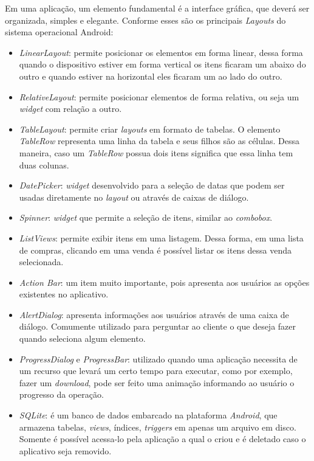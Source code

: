 	\par Em uma aplicação, um elemento fundamental é a interface gráfica, que
deverá ser organizada, simples e elegante. Conforme 
esses são os principais \textit{Layouts} do sistema operacional Android:
	\begin{itemize}
	
	 \item \textit{LinearLayout}: permite posicionar os elementos em forma
	 linear, dessa forma quando o dispositivo estiver em forma vertical os itens
	 ficaram um abaixo do outro e quando estiver na horizontal eles
	 ficaram um ao lado do outro.
	
	  \item \textit{RelativeLayout}: permite posicionar elementos de forma
	  relativa, ou seja um \textit{widget} com relação a outro.
	
	  \item \textit{TableLayout}: permite criar \textit{layouts} em formato de
	  tabelas. O elemento \textit{TableRow} representa uma linha da tabela e seus
	  filhos são as células.  Dessa maneira, caso um \textit{TableRow} possua dois
	  itens significa que essa linha tem duas colunas.
	
	  \item \textit{DatePicker}: \textit{widget} desenvolvido para a seleção de
	  datas que podem ser usadas diretamente no \textit{layout} ou através de
	  caixas de diálogo.

	  \item \textit{Spinner}: \textit{widget} que permite a seleção de itens,
	  similar ao \textit{combobox}.
	
	  \item \textit{ListViews}: permite exibir itens em uma listagem. Dessa
	  forma, em uma lista de compras, clicando em uma venda é possível listar os
	  itens dessa venda selecionada.
	
	  \item \textit{Action Bar}: um item muito importante, pois apresenta aos
	  usuários as opções existentes no aplicativo.
	
	  \item \textit{AlertDialog}: apresenta informações aos usuários através de
	  uma caixa de diálogo. Comumente utilizado para perguntar ao cliente o que
	  deseja fazer quando seleciona algum elemento.
	
	  \item \textit{ProgressDialog} e \textit{ProgressBar}: utilizado quando uma
	  aplicação necessita de um recurso que levará um certo tempo para executar,
	  como por exemplo, fazer um \textit{download}, pode ser feito uma animação
	  informando ao usuário o progresso da operação.
	  
	  \item \textit{SQLite}: é um banco de dados embarcado na plataforma
	  \textit{Android}, que armazena tabelas, \textit{views}, índices,
	  \textit{triggers} em apenas um arquivo em disco. Somente é possível
	  acessa-lo pela aplicação a qual o criou e é deletado caso o aplicativo seja
	  removido.

	\end{itemize}
	
